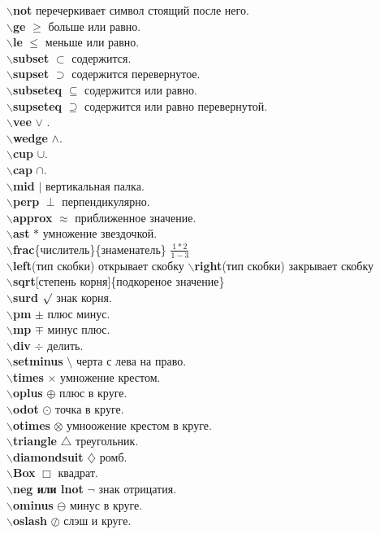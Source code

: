 \documentclass{article}
\newcommand{\bs}{$\backslash$}
\newcommand{\bd}[1]{{\bfseries #1}} %
\newcommand{\bb}[1]{\bd{\bs #1}} %
\begin{document}
\bb{not} перечеркивает символ стоящий после него.\\
\bb{ge} $\ge$ больше или равно.\\
\bb{le} $\le$ меньше или равно.\\
\bb{subset} $\subset$ содержится.\\
\bb{supset} $\supset$ содержится перевернутое.\\
\bb{subseteq} $\subseteq$ содержится или равно.\\
\bb{supseteq} $\supseteq$ содержится или равно перевернутой.\\
\bb{vee} $\vee$ .\\
\bb{wedge} $\wedge$.\\
\bb{cup} $\cup$.\\
\bb{cap} $\cap$.\\
\bb{mid} $\mid$ вертикальная палка.\\
\bb{perp} $\perp$ перпендикулярно.\\
\bb{approx} $\approx$ приближенное значение.\\
\bb{ast} $\ast$ умножение звездочкой.\\
\bb{frac}\{числитель\}\{знаменатель\} $\frac{1*2}{1-3}$\\
\bb{left}(тип скобки) открывает скобку \bb{right}(тип скобки) закрывает скобку\\
\bb{sqrt}[степень корня]\{подкореное значение\}\\
\bb{surd} $\surd$ знак корня.\\
\bb{pm} $\pm$ плюс минус.\\
\bb{mp} $\mp$ минус плюс.\\
\bb{div} $\div$ делить.\\
\bb{setminus} $\setminus$ черта с лева на право.\\
\bb{times} $\times$ умножение крестом.\\
\bb{oplus} $\oplus$ плюс в круге.\\
\bb{odot} $\odot$ точка в круге.\\
\bb{otimes} $\otimes$ умноожение крестом в круге.\\
\bb{triangle} $\triangle$ треугольник.\\
\bb{diamondsuit} $\diamondsuit$ ромб.\\
\bb{Box} $\Box$ квадрат.\\
\bb{neg или lnot} $\lnot$ знак отрицатия.\\
\bb{ominus} $\ominus$ минус в круге.\\
\bb{oslash} $\oslash$ слэш и круге.\\
\end{document}

